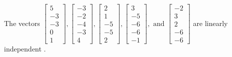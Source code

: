 \begin{exercise}
\begin{exerciseStatement}
  \end{exerciseStatement}
  \begin{exerciseAnswer}
   The vectors \(\left[\begin{array}{r}
5 \\
-3 \\
-3 \\
0 \\
1
\end{array}\right] , \left[\begin{array}{r}
-3 \\
-2 \\
-4 \\
-3 \\
4
\end{array}\right] , \left[\begin{array}{r}
2 \\
1 \\
-5 \\
-5 \\
2
\end{array}\right] , \left[\begin{array}{r}
3 \\
-5 \\
-6 \\
-6 \\
-1
\end{array}\right] , \text{ and } \left[\begin{array}{r}
-2 \\
3 \\
2 \\
-6 \\
-6
\end{array}\right]\) are 
  	 linearly independent  .
  


  \end{exerciseAnswer}
\end{exercise}